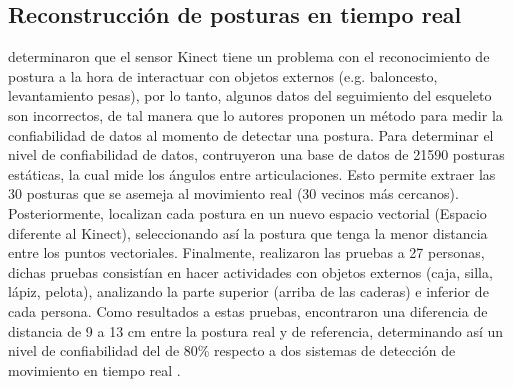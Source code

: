 \subsection{Reconstrucci\'on de posturas en tiempo real} \label{tr:2}
 determinaron que el sensor Kinect tiene un problema con el reconocimiento de postura a la hora de interactuar con objetos externos (e.g. baloncesto, levantamiento pesas), por lo tanto, algunos datos del seguimiento del esqueleto son incorrectos, de tal manera que lo autores proponen un m\'etodo para medir la confiabilidad de datos al momento de detectar una postura.
\medbreak
Para determinar el nivel de confiabilidad de datos,  contruyeron una base de datos de 21590 posturas est\'aticas, la cual mide los \'angulos entre articulaciones. Esto permite  extraer las 30 posturas que se asemeja al movimiento real (30 vecinos m\'as cercanos).  Posteriormente, localizan cada postura en un nuevo espacio vectorial (Espacio diferente al Kinect), seleccionando as\'i la postura que tenga la menor distancia entre los puntos vectoriales.
\medbreak
Finalmente,  realizaron las pruebas a 27 personas, dichas pruebas consist\'ian en hacer actividades con objetos externos (caja, silla, l\'apiz, pelota), analizando la parte superior (arriba de las caderas) e inferior de cada persona. Como resultados a estas pruebas, encontraron una diferencia de distancia de 9 a 13 cm entre la postura real y de referencia, determinando as\'i un nivel de confiabilidad del de 80\% respecto a dos sistemas de detecci\'on de movimiento en tiempo real \cite{shum2011fast,shum2012real}.
